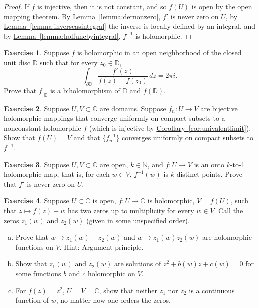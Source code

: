 \documentclass[12pt,openany]{book}
\newcommand{\C}{{\mathbb{C}}}
\newcommand{\N}{{\mathbb{N}}}
\newcommand{\D}{{\mathbb{D}}}
\theoremstyle{plain}
\theoremstyle{remark}
\theoremstyle{definition}
\newenvironment{exbox}{%
    \def\FrameCommand{\vrule width 1pt \relax\hspace{10pt}}%
    \MakeFramed{\advance\hsize-\width\FrameRestore}%
}{%
    \endMakeFramed
}
\newenvironment{exparts}{%
    \leavevmode\begin{enumerate}[a),noitemsep,topsep=0pt,parsep=0pt,partopsep=0pt]
}{%
    \end{enumerate}
}
\theoremstyle{exercise}
\newtheorem{exercise}{Exercise}[section]
\theoremstyle{example}
\newcommand{\lemmaref}[1]{\hyperref[#1]{Lemma~\ref*{#1}}}
\newcommand{\corref}[1]{\hyperref[#1]{Corollary~\ref*{#1}}}
\begin{document}
\begin{proof}
If $f$ is injective, then it is not constant, and so $f(U)$ is open by
the \hyperref[thm:OMT]{open mapping theorem}.
By \lemmaref{lemma:dernonzero}, $f'$ is never zero
on $U$, by \lemmaref{lemma:inverseasintegral} the inverse is locally defined
by an integral, and by
\lemmaref{lemma:holfuncbyintegral},
$f^{-1}$ is holomorphic.
\end{proof}

\begin{exbox}
\begin{exercise}
Suppose $f$ is holomorphic in an open neighborhood of the closed unit disc
$\overline{\D}$ such that for every $z_0 \in \D$,
\begin{equation*}
\int_{\partial \D}
\frac{f'(z)}{f(z)-f(z_0)}
\, dz = 2\pi i .
\end{equation*}
Prove that $f|_{\D}$ is a biholomorphism of $\D$ and $f(\D)$.
\end{exercise}

\begin{exercise}
Suppose $U,V \subset \C$ are domains.
Suppose $f_n \colon U \to V$ are bijective holomorphic mappings
that converge uniformly on compact subsets to a nonconstant
holomorphic $f$ (which is injective by \corref{cor:univalentlimit}).
Show that $f(U) = V$ and that $\bigl\{ f_n^{-1} \bigr\}$ converges uniformly on
compact subsets to $f^{-1}$.
\end{exercise}

\begin{exercise} \label{exercise:ktoone}
Suppose $U,V \subset \C$ are open, $k \in \N$, and $f \colon U \to V$ is an
onto $k$-to-1
holomorphic map, that is, for each $w \in V$, $f^{-1}(w)$ is $k$ distinct
points.  Prove that $f'$ is never zero on $U$.
\end{exercise}

\begin{exercise}
Suppose $U \subset \C$ is open, $f \colon U \to \C$ is
holomorphic, $V = f(U)$, such that $z \mapsto f(z)-w$
has two zeros up to multiplicity for every $w \in V$.
Call the zeros
$z_1(w)$ and $z_2(w)$ (given in some unspecified order).
\begin{exparts}
\item
Prove that $w \mapsto z_1(w)+z_2(w)$ and 
$w \mapsto z_1(w)z_2(w)$ are holomorphic functions on $V$.
Hint: Argument principle.
\item
Show that $z_1(w)$ and $z_2(w)$ are solutions of
$z^2 + b(w) z + c(w) = 0$ for some functions $b$ and $c$ holomorphic on $V$.
\item
For $f(z) = z^2$, $U = V = \C$, show that neither $z_1$ nor $z_2$ is a continuous
function of $w$,
no matter how one orders the zeros.
\end{exparts}
\end{exercise}
\end{exbox}
\end{document}
